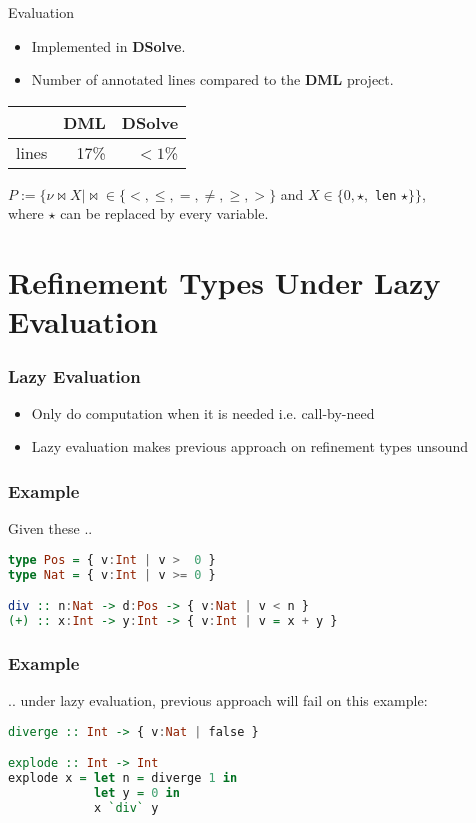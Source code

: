 \documentclass[pdf]{beamer}
\begin{document}
\begin{frame}{Evaluation}
  \begin{itemize}
    \item Implemented in \textbf{DSolve}.
    \item Number of annotated lines compared to the \textbf{DML} project.
  \end{itemize}
  \begin{table}
    \begin{tabular}{l|r|r}
            & \textbf{DML} & \textbf{DSolve}\\
      \hline
      lines & 17\%         & $< 1$\%
    \end{tabular}
  \end{table}
  $P := \{\nu \bowtie X \mid \bowtie \in \{<, \le, =, \neq, \geq, >\}$ and $X \in \{0, \star,$ \lstinline{len} $\star\}\}$,\\
  where $\star$ can be replaced by every variable.
\end{frame}

\section{Refinement Types Under Lazy Evaluation}

\begin{frame}
  \frametitle{Lazy Evaluation}
  \begin{itemize}
    \item Only do computation when it is needed i.e. call-by-need
    \item Lazy evaluation makes previous approach on refinement types unsound
  \end{itemize}
\end{frame}

\begin{frame}[fragile]
  \frametitle{Example}
  Given these ..
  \begin{lstlisting}[language=haskell]
type Pos = { v:Int | v >  0 }
type Nat = { v:Int | v >= 0 }

div :: n:Nat -> d:Pos -> { v:Nat | v < n } 
(+) :: x:Int -> y:Int -> { v:Int | v = x + y }
  \end{lstlisting}
\end{frame}

\begin{frame}[fragile]
  \frametitle{Example}
  .. under lazy evaluation, previous approach will fail on this example:
  \begin{lstlisting}[language=haskell]
diverge :: Int -> { v:Nat | false } 

explode :: Int -> Int
explode x = let n = diverge 1 in 
            let y = 0 in 
            x `div` y
  \end{lstlisting}
\end{frame}
\end{document}
